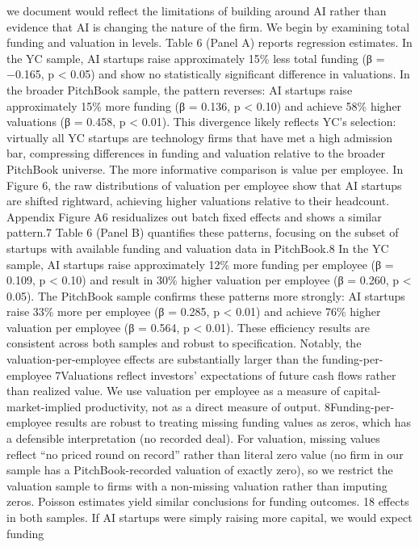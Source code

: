 we document would reflect the limitations of building around AI rather than evidence that AI is
changing the nature of the firm.
We begin by examining total funding and valuation in levels. Table 6 (Panel A) reports regression
estimates. In the YC sample, AI startups raise approximately 15\% less total funding (β = −0.165,
p < 0.05) and show no statistically significant difference in valuations. In the broader PitchBook
sample, the pattern reverses: AI startups raise approximately 15\% more funding (β = 0.136, p <
0.10) and achieve 58\% higher valuations (β = 0.458, p < 0.01). This divergence likely reflects
YC’s selection: virtually all YC startups are technology firms that have met a high admission bar,
compressing differences in funding and valuation relative to the broader PitchBook universe.
The more informative comparison is value per employee. In Figure 6, the raw distributions of
valuation per employee show that AI startups are shifted rightward, achieving higher valuations
relative to their headcount. Appendix Figure A6 residualizes out batch fixed effects and shows a
similar pattern.7
Table 6 (Panel B) quantifies these patterns, focusing on the subset of startups with available
funding and valuation data in PitchBook.8 In the YC sample, AI startups raise approximately 12\%
more funding per employee (β = 0.109, p < 0.10) and result in 30\% higher valuation per employee
(β = 0.260, p < 0.05). The PitchBook sample confirms these patterns more strongly: AI startups
raise 33\% more per employee (β = 0.285, p < 0.01) and achieve 76\% higher valuation per employee
(β = 0.564, p < 0.01). These efficiency results are consistent across both samples and robust to
specification.
Notably, the valuation-per-employee effects are substantially larger than the funding-per-employee
7Valuations reflect investors’ expectations of future cash flows rather than realized value. We use valuation per
employee as a measure of capital-market-implied productivity, not as a direct measure of output.
8Funding-per-employee results are robust to treating missing funding values as zeros, which has a defensible
interpretation (no recorded deal). For valuation, missing values reflect “no priced round on record” rather than
literal zero value (no firm in our sample has a PitchBook-recorded valuation of exactly zero), so we restrict the
valuation sample to firms with a non-missing valuation rather than imputing zeros. Poisson estimates yield similar
conclusions for funding outcomes.
18
effects in both samples. If AI startups were simply raising more capital, we would expect funding
